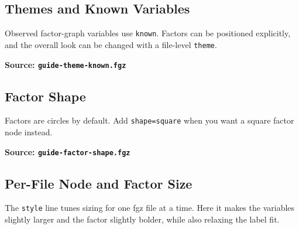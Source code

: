 \documentclass{article}
\begin{document}
\subsection{Themes and Known Variables}
Observed factor-graph variables use \texttt{known}. Factors can be positioned explicitly,
and the overall look can be changed with a file-level \texttt{theme}.

\begin{samepage}
  \noindent
  \begin{minipage}[t]{0.41\textwidth}
    \centering
    \vspace{0.5cm}
    
  \end{minipage}\hfill
  \begin{minipage}[t]{0.55\textwidth}
    \textbf{Source: \texttt{guide-theme-known.fgz}}
  \end{minipage}
\end{samepage}

\subsection{Factor Shape}
Factors are circles by default. Add \texttt{shape=square} when you want a square factor
node instead.

\begin{samepage}
  \noindent
  \begin{minipage}[t]{0.41\textwidth}
    \centering
    \vspace{0.5cm}
    
  \end{minipage}\hfill
  \begin{minipage}[t]{0.55\textwidth}
    \textbf{Source: \texttt{guide-factor-shape.fgz}}
  \end{minipage}
\end{samepage}

\subsection{Per-File Node and Factor Size}
The \texttt{style} line tunes sizing for one fgz file at a time. Here it makes the
variables slightly larger and the factor slightly bolder, while also relaxing the label fit.
\end{document}
